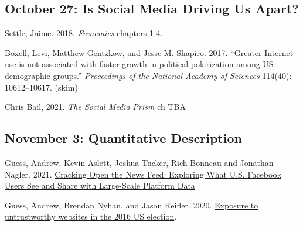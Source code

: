\vspace{-.1in}\documentclass[11pt]{article}
\begin{document}
\subsection*{October 27: Is Social Media Driving Us Apart?}

\noindent Settle, Jaime. 2018. {\it Frenemies} chapters 1-4.

\noindent Boxell, Levi, Matthew Gentzkow, and Jesse M. Shapiro. 2017. ``Greater Internet use is not associated with faster growth in political polarization among US demographic groups.''
\emph{Proceedings of the National Academy of Sciences} 114(40): 10612--10617. (skim)


\noindent Chris Bail, 2021. \textit{The Social Media Prism} ch TBA



%
%
%
%


\subsection*{November 3: Quantitative Description}






Guess, Andrew, Kevin Aslett, Joshua Tucker, Rich Bonneau and Jonathan Nagler. 2021. \href{https://journalqd.org/article/view/2586}{Cracking Open the News Feed:	Exploring What U.S. Facebook Users See and Share with Large-Scale Platform Data}

\noindent Guess, Andrew, Brendan Nyhan, and Jason Reifler. 2020. \href{https://www.nature.com/articles/s41562-020-0833-x?proof=t}{Exposure to untrustworthy websites in the 2016 US election}.
\end{document}
